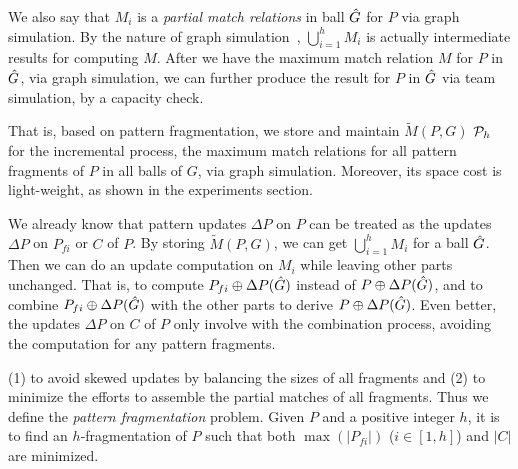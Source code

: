 We also say that $M_i$ is a {\em partial match relations} in ball $\hat{G}{}$ for $P$ via graph simulation.
By the nature of graph simulation~\cite{infsimu95}, $\bigcup_{i=1}^{h}M_{i}$ is actually intermediate results for computing $M$.
After we have the maximum match relation $M$ for $P$ in $\hat{G}{}$, via graph simulation, we can further produce the result for $P$ in  $\hat{G}{}$ via team simulation, by a capacity check.

That is, based on pattern fragmentation, we store and maintain $\tilde{M}(P,G)$ \wrt ${\cal P}_{h}$ for the incremental process,
\ie the maximum match relations for all pattern fragments of $P$ in all balls of $G$, via graph simulation.
Moreover, its space cost is light-weight, as shown in the experiments section.



We already know that pattern updates $\Delta P$ on $P$ can be treated as the updates $\Delta P$ on $P_{fi}$ or $C$ of $P$.
By storing $\tilde{M}(P,G)$, we can get $\bigcup_{i=1}^{h}M_{i}$ for a ball $\hat{G}{}$.
Then we can do an update computation on $M_i$ while leaving other parts unchanged. That is, to compute $P_{fi}\oplus\Delta P(\hat{G}{})$ instead of $P\oplus\Delta P(\hat{G}{})$, and to combine $P_{fi}\oplus\Delta P(\hat{G}{})$ with the other parts to derive $P\oplus\Delta P(\hat{G}{})$.
Even better, the updates $\Delta P$ on $C$ of $P$ only involve with the combination process, avoiding the computation for any pattern fragments.

\vspace{0.8ex}
 (1) to avoid skewed updates by balancing the sizes of all fragments and (2) to minimize the efforts to assemble the partial matches of all fragments.
Thus we define the {\em pattern fragmentation} problem. Given $P$ and a positive integer $h$, it is to find
an $h$-fragmentation of $P$ such that both $\max(|P_{fi}|)$ ($i\in[1,h]$) and $|C|$ are minimized.

